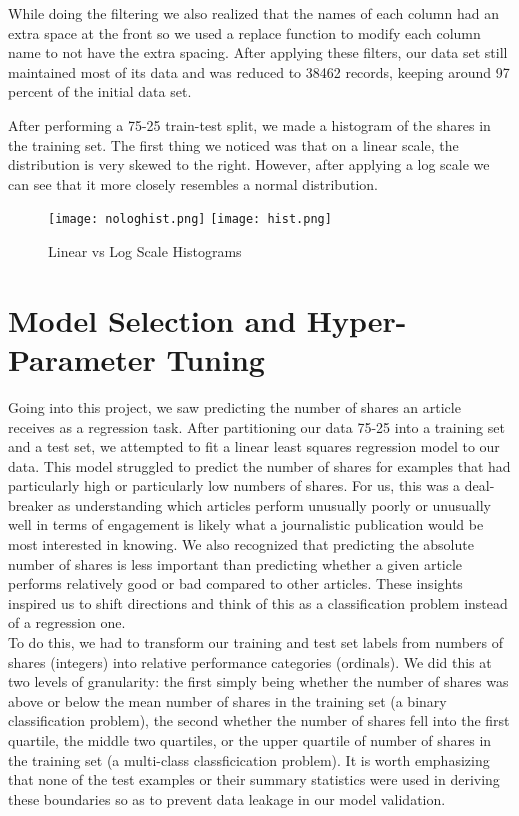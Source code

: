 \documentclass{article}
\begin{document}
While doing the filtering we also realized that the names of each column had an extra space at the front so we used a replace function to modify each column name to not have the extra spacing. After applying these filters, our data set still maintained most of its data and was reduced to 38462 records, keeping around 97 percent of the initial data set.

After performing a 75-25 train-test split, we made a histogram of the shares in the training set. The first thing we noticed was that on a linear scale, the distribution is very skewed to the right. However, after applying a log scale we can see that it more closely resembles a normal distribution.

\begin{figure}[h!]
    \centering
    \texttt{[image: nologhist.png]}
    \texttt{[image: hist.png]}
    \caption{Linear vs Log Scale Histograms}
    \label{fig:hist}
\end{figure}


\section{Model Selection and Hyper-Parameter Tuning}
Going into this project, we saw predicting the number of shares an article receives as a regression task. After partitioning our data 75-25 into a training set and a test set, we attempted to fit a linear least squares regression model to our data. This model struggled to predict the number of shares for examples that had particularly high or particularly low numbers of shares. For us, this was a deal-breaker as understanding which articles perform unusually poorly or unusually well in terms of engagement is likely what a journalistic publication would be most interested in knowing. We also recognized that predicting the absolute number of shares is less important than predicting whether a given article performs relatively good or bad compared to other articles. These insights inspired us to shift directions and think of this as a classification problem instead of a regression one.\\

To do this, we had to transform our training and test set labels from numbers of shares (integers) into relative performance categories (ordinals). We did this at two levels of granularity: the first simply being whether the number of shares was above or below the mean number of shares in the training set (a binary classification problem), the second whether the number of shares fell into the first quartile, the middle two quartiles, or the upper quartile of number of shares in the training set (a multi-class classficication problem). It is worth emphasizing that none of the test examples or their summary statistics were used in deriving these boundaries so as to prevent data leakage in our model validation.\\
\end{document}
